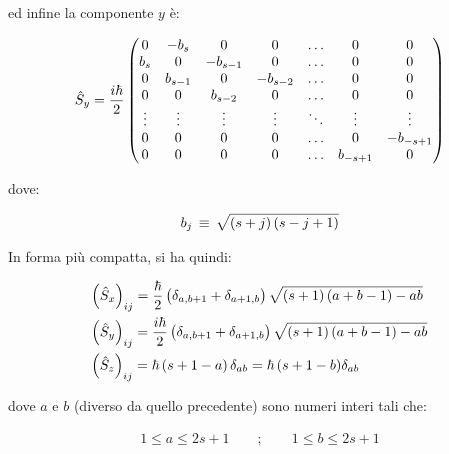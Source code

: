 	ed infine la componente $y$ è:

\begin{align*}
	\hat{S}_y = \frac{i\hbar}{2} \, \mqty( 0 & -b_s & 0 & 0 & \ldots & 0 & 0 \\ b_s & 0 & - b_{s-1} & 0 & \ldots & 0 & 0 \\ 0 & b_{s-1} & 0 &  - b_{s-2} & \ldots & 0 & 0 \\ 0 & 0 & b_{s-2} &  0 & \ldots & 0 & 0 \\ \vdots & \vdots & \vdots & \vdots & \ddots & \vdots & \vdots \\ 0 & 0 & 0 & 0 & \ldots & 0 & -b_{-s +1} \\ 0 & 0 & 0 & 0 & \ldots & b_{-s+ 1} & 0)
\end{align*}

	dove:
	
\begin{align*}
	b_j \, \equiv \,  \sqrt{\qty(s + j) \, \qty(s - j + 1)}
\end{align*}

	In forma più compatta, si ha quindi:
	
\begin{align*}
	& \qty(\hat{S}_x)_{ij}  = \frac{\hbar}{2} \, \qty\big(\delta_{a, b +1} + \delta_{a + 1, b}) \, \sqrt{\qty(s + 1) \, \qty(a +b -1) - ab} \\
	& \qty(\hat{S}_y)_{ij}  = \frac{i\hbar}{2} \, \qty\big(\delta_{a, b +1} + \delta_{a + 1, b}) \, \sqrt{\qty(s + 1) \, \qty(a +b -1) - ab}  \\
	& \qty(\hat{S}_z)_{ij}  = \hbar \, \qty( s +1 - a) \, \delta_{ab} = \hbar \, \qty(s + 1 - b ) \delta_{ab}
\end{align*}

	dove $a$ e $b$ (diverso da quello precedente) sono numeri interi tali che:
	
\begin{align*}
	1 \leq a \leq 2s + 1 \qquad ; \qquad 1 \leq b \leq 2s + 1 
\end{align*}


	
